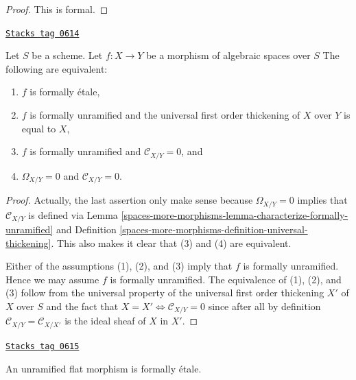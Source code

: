 \begin{proof}
This is formal.
\end{proof}

\begin{lemma}
\label{spaces-more-morphisms-lemma-characterize-formally-etale}
\href{https://stacks.math.columbia.edu/tag/0614}{\texttt{Stacks tag 0614}}

Let $S$ be a scheme.
Let $f : X \to Y$ be a morphism of algebraic spaces over $S$
The following are equivalent:
\begin{enumerate}
\item $f$ is formally \'etale,
\item $f$ is formally unramified and the universal first order thickening
of $X$ over $Y$ is equal to $X$,
\item $f$ is formally unramified and $\mathcal{C}_{X/Y} = 0$, and
\item $\Omega_{X/Y} = 0$ and $\mathcal{C}_{X/Y} = 0$.
\end{enumerate}
\end{lemma}

\begin{proof}
Actually, the last assertion only make sense because $\Omega_{X/Y} = 0$
implies that $\mathcal{C}_{X/Y}$ is defined via
Lemma \ref{spaces-more-morphisms-lemma-characterize-formally-unramified}
and
Definition \ref{spaces-more-morphisms-definition-universal-thickening}.
This also makes it clear that (3) and (4) are equivalent.

\medskip\noindent
Either of the assumptions (1), (2), and (3) imply that $f$ is formally
unramified. Hence we may assume $f$ is formally unramified. The equivalence
of (1), (2), and (3) follow from the universal property of the universal
first order thickening $X'$ of $X$ over $S$ and the fact that
$X = X' \Leftrightarrow \mathcal{C}_{X/Y} = 0$ since
after all by definition $\mathcal{C}_{X/Y} = \mathcal{C}_{X/X'}$
is the ideal sheaf of $X$ in $X'$.
\end{proof}

\begin{lemma}
\label{spaces-more-morphisms-lemma-unramified-flat-formally-etale}
\href{https://stacks.math.columbia.edu/tag/0615}{\texttt{Stacks tag 0615}}

An unramified flat morphism is formally \'etale.
\end{lemma}


